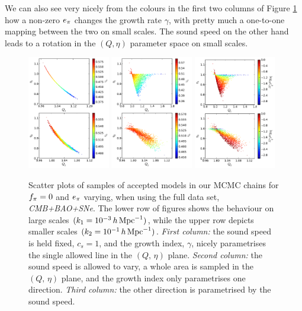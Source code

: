 We can also see very nicely from the colours in the first two columns of Figure \ref{fig:3d} how a non-zero $\aa$ changes the growth
rate $\gamma$, with pretty much a one-to-one mapping between the two on small scales. The sound speed on the other hand leads to a rotation
in the $(Q,\eta)$ parameter space on small scales.

\begin{figure}[tb]
\centering
\includegraphics[width=0.32\textwidth]{figures/chapter-ade/PWHiBSwe0_3D_gamma.pdf}
\includegraphics[width=0.32\textwidth]{figures/chapter-ade/PWHiBSwec_3D_gamma.pdf}
\includegraphics[width=0.32\textwidth]{figures/chapter-ade/PWHiBSwec_3D_ceff.pdf}
\caption{Scatter plots of samples of accepted models in our MCMC chains for $\ff=0$ and $\aa$ varying,  when using the full data set, \emph{CMB+BAO+SNe}. The lower row of figures shows the behaviour on large scales $( k_1 = 10^{-3} \,h\,\Mpc^{-1})$, while the upper row depicts smaller scales $ (k_2 = 10^{-1} \,h\,\Mpc^{-1}) $.  \emph{First column:} the sound speed is held fixed, $c_s=1$, and the growth index, $\gamma$, nicely parametrises the single allowed line in the $(Q,\,\eta)$ plane. \emph{Second column:} the sound speed is allowed to vary, a whole area is sampled in the $(Q,\,\eta)$ plane, and the growth index only parametrises one direction. \emph{Third column:} the other direction is parametrised by the sound speed.}
\label{fig:3d}
\end{figure}


